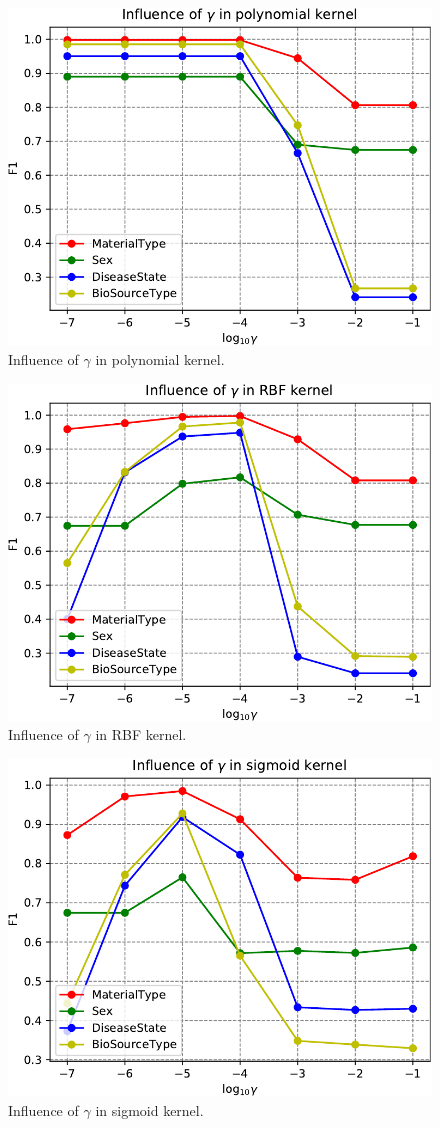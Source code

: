 \documentclass[sigconf]{acmart}
\begin{document}
\begin{figure}[h]
\centering
\includegraphics[width=0.8\linewidth]{../figs/gamma_poly}
\caption{Influence of $\gamma$ in polynomial kernel.}
\label{fig:gamma_poly}
\end{figure}

\begin{figure}[h]
\centering
\includegraphics[width=0.8\linewidth]{../figs/gamma_rbf}
\caption{Influence of $\gamma$ in RBF kernel.}
\label{fig:gamma_rbf}
\end{figure}

\begin{figure}[h]
\centering
\includegraphics[width=0.8\linewidth]{../figs/gamma_sigmoid}
\caption{Influence of $\gamma$ in sigmoid kernel.}
\label{fig:gamma_sigmoid}
\end{figure}
\end{document}
